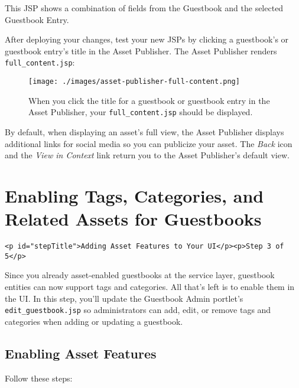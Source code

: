 This JSP shows a combination of fields from the Guestbook and the
selected Guestbook Entry.

After deploying your changes, test your new JSPs by clicking a
guestbook's or guestbook entry's title in the Asset Publisher. The Asset
Publisher renders \texttt{full\_content.jsp}:

\begin{figure}
\centering
\texttt{[image: ./images/asset-publisher-full-content.png]}
\caption{When you click the title for a guestbook or guestbook entry in
the Asset Publisher, your \texttt{full\_content.jsp} should be
displayed.}
\end{figure}

By default, when displaying an asset's full view, the Asset Publisher
displays additional links for social media so you can publicize your
asset. The \emph{Back} icon and the \emph{View in Context} link return
you to the Asset Publisher's default view.

\chapter{Enabling Tags, Categories, and Related Assets for
Guestbooks}\label{enabling-tags-categories-and-related-assets-for-guestbooks}

\begin{verbatim}
<p id="stepTitle">Adding Asset Features to Your UI</p><p>Step 3 of 5</p>
\end{verbatim}

Since you already asset-enabled guestbooks at the service layer,
guestbook entities can now support tags and categories. All that's left
is to enable them in the UI. In this step, you'll update the Guestbook
Admin portlet's \texttt{edit\_guestbook.jsp} so administrators can add,
edit, or remove tags and categories when adding or updating a guestbook.

\section{Enabling Asset Features}\label{enabling-asset-features}

Follow these steps:

